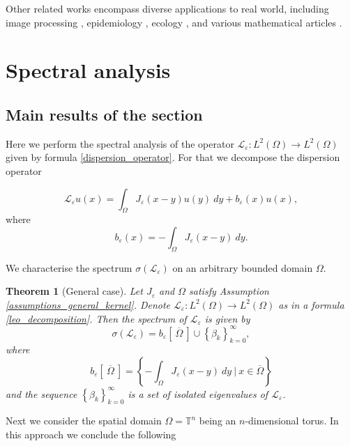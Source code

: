 \documentclass[12pt, a4paper]{article}
\theoremstyle{break}
\newtheorem{thm}{Theorem}[section]
\theoremstyle{break}
\theoremstyle{break}
\theoremstyle{break}
\theoremstyle{break}
\newcommand{\Leo}{\mathcal{L}_{\varepsilon}}
\newcommand{\Seq}[2]{\left\{#1_#2\right\}_{#2 = 0}^\infty}
\newcommand{\Leb}{L^2\left(\Omega\right)}
\begin{document}
Other related works encompass diverse applications to real world, including image processing \cite{GilboaOsher2007, GilboaOsher2009}, epidemiology \cite{Yang2019}, ecology \cite{Hadeler1999}, and various mathematical articles \cite{Biler2019, SlevinskyMontanelli2018, Sun2023, Sun2022}.

\section{Spectral analysis} \label{sec:spectral_analysis}

\subsection{Main results of the section}

Here we perform the spectral analysis of the operator $\Leo: L^2(\Omega) \rightarrow L^2(\Omega)$ given by formula \eqref{dispersion_operator}. For that we decompose the dispersion operator

\begin{equation}
    \Leo u(x) = \int_\Omega J_\varepsilon(x-y) u(y)\:dy + b_\varepsilon(x)u(x),
    \label{leo_decomposition}
\end{equation}
where
\begin{equation}
    b_\varepsilon(x) = -\int_\Omega J_\varepsilon(x-y)\:dy. \label{b_epsilon}
\end{equation}

We characterise the spectrum $\sigma(\Leo)$ on an arbitrary bounded domain $\Omega$.

\begin{thm}[General case]
    Let $J_\varepsilon$ and $\Omega$ satisfy Assumption \ref{assumptions_general_kernel}. Denote $\Leo: \Leb \rightarrow \Leb$ as in a formula \eqref{leo_decomposition}. Then the spectrum of $\Leo$ is given by
    \begin{equation}
        \sigma(\Leo) = b_\varepsilon \left[\: \overline{\Omega} \:\right] \cup \Seq{\beta}{k},
        \label{EQ:spectrum_formula_general}
    \end{equation}
    where
    $$b_\varepsilon\left[\: \overline{\Omega} \:\right] = \left\{ - \int_\Omega J_\varepsilon(x-y) \:dy \:\Big|\: x \in \overline{\Omega }\right\}$$
    and the sequence $\Seq{\beta}{k}$ is a set of isolated eigenvalues of $\Leo$. \label{thm:dispersion_spectrum}
\end{thm}

Next we consider the spatial domain $\Omega = \mathbb{T}^n$  being an $n$-dimensional torus. In this approach we conclude the following
\end{document}
